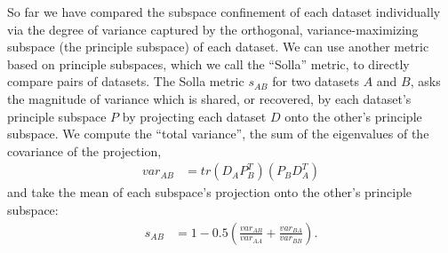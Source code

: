 \documentclass[../main.tex]{subfiles}
\begin{document}
So far we have compared the subspace confinement of each dataset individually via the degree of variance captured by the orthogonal, variance-maximizing subspace (the principle subspace) of each dataset. We can use another metric based on principle subspaces, which we call the ``Solla'' metric, to directly compare pairs of datasets\cite{yanUnexpectedComplexityEveryday2020}. The Solla metric $s_{AB}$ for two datasets $A$ and $B$, asks the magnitude of variance which is shared, or recovered, by each dataset's principle subspace $P$ by projecting each dataset $D$ onto the other's principle subspace. We compute the ``total variance'', the sum of the eigenvalues of the covariance of the projection,
%
\begin{align}
  var_{AB} &= tr{(D_AP_B^T)(P_BD_A^T)}
\end{align}
%
and take the mean of each subspace's projection onto the other's principle subspace:
%
\begin{align}
  s_{AB} &= 1 - 0.5\left( \frac{var_{AB}}{var_{AA}} + \frac{var_{BA}}{var_{BB}} \right).
\end{align}
%
\end{document}
